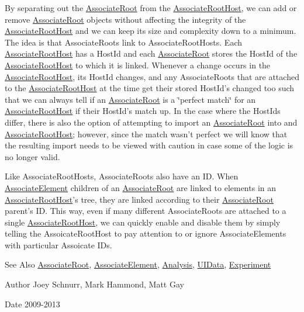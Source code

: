By separating out the \hyperlink{class_picto_1_1_associate_root}{Associate\-Root} from the \hyperlink{class_picto_1_1_associate_root_host}{Associate\-Root\-Host}, we can add or remove \hyperlink{class_picto_1_1_associate_root}{Associate\-Root} objects without affecting the integrity of the \hyperlink{class_picto_1_1_associate_root_host}{Associate\-Root\-Host} and we can keep its size and complexity down to a minimum. The idea is that Associate\-Roots link to Associate\-Root\-Hosts. Each \hyperlink{class_picto_1_1_associate_root_host}{Associate\-Root\-Host} has a Host\-Id and each \hyperlink{class_picto_1_1_associate_root}{Associate\-Root} stores the Host\-Id of the \hyperlink{class_picto_1_1_associate_root_host}{Associate\-Root\-Host} to which it is linked. Whenever a change occurs in the \hyperlink{class_picto_1_1_associate_root_host}{Associate\-Root\-Host}, its Host\-Id changes, and any Associate\-Roots that are attached to the \hyperlink{class_picto_1_1_associate_root_host}{Associate\-Root\-Host} at the time get their stored Host\-Id's changed too such that we can always tell if an \hyperlink{class_picto_1_1_associate_root}{Associate\-Root} is a \char`\"{}perfect match\char`\"{} for an \hyperlink{class_picto_1_1_associate_root_host}{Associate\-Root\-Host} if their Host\-Id's match up. In the case where the Host\-Ids differ, there is also the option of attempting to import an \hyperlink{class_picto_1_1_associate_root}{Associate\-Root} into and \hyperlink{class_picto_1_1_associate_root_host}{Associate\-Root\-Host}; however, since the match wasn't perfect we will know that the resulting import needs to be viewed with caution in case some of the logic is no longer valid.

Like Associate\-Root\-Hosts, Associate\-Roots also have an I\-D. When \hyperlink{class_picto_1_1_associate_element}{Associate\-Element} children of an \hyperlink{class_picto_1_1_associate_root}{Associate\-Root} are linked to elements in an \hyperlink{class_picto_1_1_associate_root_host}{Associate\-Root\-Host}'s tree, they are linked according to their \hyperlink{class_picto_1_1_associate_root}{Associate\-Root} parent's I\-D. This way, even if many different Associate\-Roots are attached to a single \hyperlink{class_picto_1_1_associate_root_host}{Associate\-Root\-Host}, we can quickly enable and disable them by simply telling the Assoicate\-Root\-Host to pay attention to or ignore Associate\-Elements with particular Assoicate I\-Ds.

\begin{DoxySeeAlso}{See Also}
\hyperlink{class_picto_1_1_associate_root}{Associate\-Root}, \hyperlink{class_picto_1_1_associate_element}{Associate\-Element}, \hyperlink{class_picto_1_1_analysis}{Analysis}, \hyperlink{class_picto_1_1_u_i_data}{U\-I\-Data}, \hyperlink{class_picto_1_1_experiment}{Experiment} 
\end{DoxySeeAlso}
\begin{DoxyAuthor}{Author}
Joey Schnurr, Mark Hammond, Matt Gay 
\end{DoxyAuthor}
\begin{DoxyDate}{Date}
2009-\/2013 
\end{DoxyDate}


